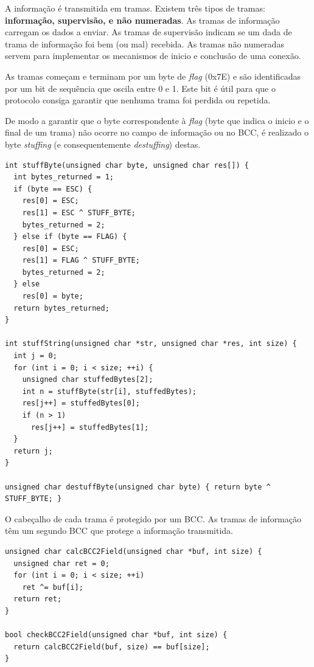 \documentclass[11pt]{report}
\begin{document}
A informação é transmitida em tramas. Existem três tipos de tramas:
\textbf{informação, supervisão, e não numeradas}. As tramas de informação
carregam os dados a enviar. As tramas de supervisão indicam se um dada de
trama de informação foi bem (ou mal) recebida. As tramas não numeradas servem
para implementar os mecanismos de inicio e conclusão de uma conexão.

As tramas começam e terminam por um byte de \textit{flag} (0x7E) e são
identificadas por um bit de sequência que oscila entre 0 e 1. Este bit é útil
para que o protocolo consiga garantir que nenhuma trama foi perdida ou repetida.

De modo a garantir que o byte correspondente à \textit{flag} (byte que indica
o inicio e o final de um trama) não ocorre no campo de informação ou no BCC,
é realizado o byte \textit{stuffing} (e consequentemente \textit{destuffing})
destas.
\begin{lstlisting}
int stuffByte(unsigned char byte, unsigned char res[]) {
  int bytes_returned = 1;
  if (byte == ESC) {
    res[0] = ESC;
    res[1] = ESC ^ STUFF_BYTE;
    bytes_returned = 2;
  } else if (byte == FLAG) {
    res[0] = ESC;
    res[1] = FLAG ^ STUFF_BYTE;
    bytes_returned = 2;
  } else
    res[0] = byte;
  return bytes_returned;
}

int stuffString(unsigned char *str, unsigned char *res, int size) {
  int j = 0;
  for (int i = 0; i < size; ++i) {
    unsigned char stuffedBytes[2];
    int n = stuffByte(str[i], stuffedBytes);
    res[j++] = stuffedBytes[0];
    if (n > 1)
      res[j++] = stuffedBytes[1];
  }
  return j;
}

unsigned char destuffByte(unsigned char byte) { return byte ^ STUFF_BYTE; }
\end{lstlisting}

O cabeçalho de cada trama é protegido por um BCC. As tramas de informação têm um
segundo BCC que protege a informação transmitida.
\begin{lstlisting}
unsigned char calcBCC2Field(unsigned char *buf, int size) {
  unsigned char ret = 0;
  for (int i = 0; i < size; ++i)
    ret ^= buf[i];
  return ret;
}

bool checkBCC2Field(unsigned char *buf, int size) {
  return calcBCC2Field(buf, size) == buf[size];
}
\end{lstlisting}
\end{document}
